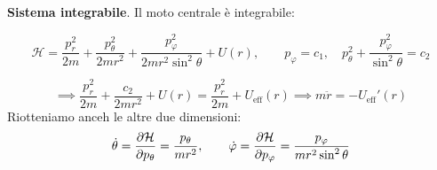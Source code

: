 \begin{example}
    \textbf{Sistema integrabile}. Il moto centrale è integrabile:

    \begin{equation}
        \mathcal{H} = \frac{p_r^2}{2m} + \frac{p_\theta^2}{2mr^2} + \frac{p_\varphi^2}{2mr^2\sin^2\theta} + U(r), 
        \qquad p_\varphi = c_1, \quad p_\theta^2 + \frac{p_\varphi^2}{\sin^2\theta} = c_2
    \end{equation}

    \begin{equation}
        \implies \frac{p_r^2}{2m} + \frac{c_2}{2mr^2} + U(r) = \frac{p_r^2}{2m} + U_\text{eff}(r)
        \implies m\ddot{r} = -U_\text{eff}'(r)
    \end{equation}
    Riotteniamo anceh le altre due dimensioni:
    \begin{equation}
        \dot{\theta} = \pdv{\mathcal{H}}{p_\theta} = \frac{p_\theta}{mr^2}, 
        \qquad 
        \dot{\varphi} = \pdv{\mathcal{H}}{p_\varphi} = \frac{p_\varphi}{mr^2\sin^2\theta}
    \end{equation}
    

\end{example}

